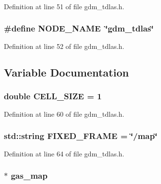 Definition at line 51 of file gdm\_\-tdlas.h.

\subsubsection[{NODE\_\-NAME}]{\setlength{\rightskip}{0pt plus 5cm}\#define NODE\_\-NAME~\char`\"{}gdm\_\-tdlas\char`\"{}}\label{gdm__tdlas_8h_a8cc8d559acdd2f74085b20977182d5b7}


Definition at line 52 of file gdm\_\-tdlas.h.



\subsection{Variable Documentation}
\subsubsection[{CELL\_\-SIZE}]{\setlength{\rightskip}{0pt plus 5cm}double {\bf CELL\_\-SIZE} = 1}\label{gdm__tdlas_8h_a4cf9ff51a66312cba25005de9de38c30}


Definition at line 60 of file gdm\_\-tdlas.h.

\subsubsection[{FIXED\_\-FRAME}]{\setlength{\rightskip}{0pt plus 5cm}std::string {\bf FIXED\_\-FRAME} = \char`\"{}/map\char`\"{}}\label{gdm__tdlas_8h_ae723813911dffa4fe96261e3bc59c131}


Definition at line 64 of file gdm\_\-tdlas.h.

\subsubsection[{gas\_\-map}]{$\ast$ {\bf gas\_\-map}}\label{gdm__tdlas_8h_ade0f976bd45ebb046e717c19f8361b8a}


